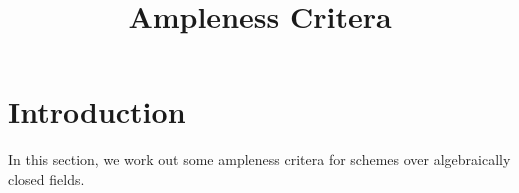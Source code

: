 

\title{Ampleness Critera}
\maketitle

\section{Introduction}
In this section, we work out some ampleness critera for schemes over
algebraically closed fields.





